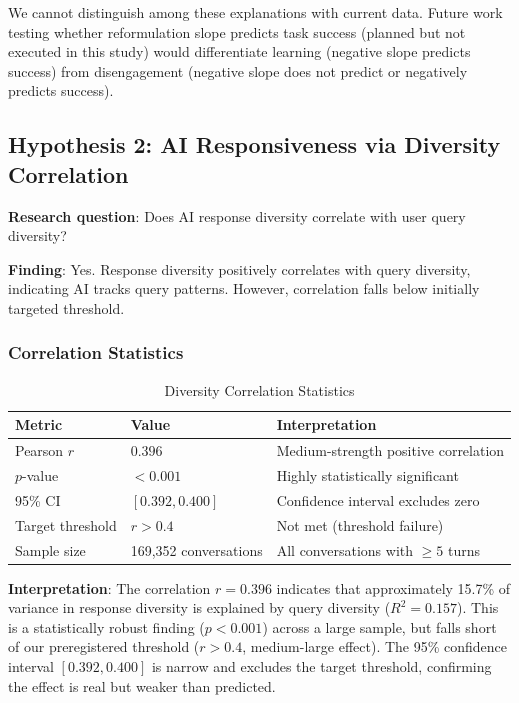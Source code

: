 We cannot distinguish among these explanations with current data. Future work testing whether reformulation slope predicts task success (planned but not executed in this study) would differentiate learning (negative slope predicts success) from disengagement (negative slope does not predict or negatively predicts success).

\subsection{Hypothesis 2: AI Responsiveness via Diversity Correlation}

\textbf{Research question}: Does AI response diversity correlate with user query diversity?

\textbf{Finding}: Yes. Response diversity positively correlates with query diversity, indicating AI tracks query patterns. However, correlation falls below initially targeted threshold.

\subsubsection{Correlation Statistics}

\begin{table}[h]
\centering
\caption{Diversity Correlation Statistics}
\label{tab:corr_stats}
\begin{tabular}{lll}
\toprule
Metric & Value & Interpretation \\
\midrule
Pearson $r$ & $0.396$ & Medium-strength positive correlation \\
$p$-value & $< 0.001$ & Highly statistically significant \\
95\% CI & $[0.392, 0.400]$ & Confidence interval excludes zero \\
Target threshold & $r > 0.4$ & Not met (threshold failure) \\
Sample size & 169,352 conversations & All conversations with $\geq 5$ turns \\
\bottomrule
\end{tabular}
\end{table}

\textbf{Interpretation}: The correlation $r = 0.396$ indicates that approximately 15.7\% of variance in response diversity is explained by query diversity ($R^2 = 0.157$). This is a statistically robust finding ($p < 0.001$) across a large sample, but falls short of our preregistered threshold ($r > 0.4$, medium-large effect). The 95\% confidence interval $[0.392, 0.400]$ is narrow and excludes the target threshold, confirming the effect is real but weaker than predicted.

